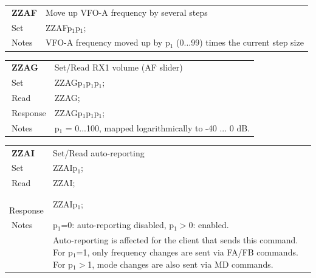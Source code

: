 \documentclass[12pt]{book}
\begin{document}
\begin{center}
\begin{tabular}{|p{2cm}|p{11cm}|}
\toprule
$\phantom{\Big|}$\textbf{\large ZZAF} & Move up VFO-A frequency by several steps \\\cline{1-2}
$\phantom{\Big|}${\large Set} & {ZZAFp$_1$p$_1$;} \\\hline
$\phantom{\Big|}${\large Notes} & \multicolumn{1}{|p{11cm}|}{VFO-A frequency moved up by p$_1$ (0...99) times the current step size} \\
\bottomrule
\end{tabular}
\end{center}

\begin{center}
\begin{tabular}{|p{2cm}|p{11cm}|}
\toprule
$\phantom{\Big|}$\textbf{\large ZZAG} & Set/Read RX1 volume (AF slider) \\\cline{1-2}
$\phantom{\Big|}${\large Set} & {ZZAGp$_1$p$_1$p$_1$;} \\\hline
$\phantom{\Big|}${\large Read} & {ZZAG;} \\\hline
$\phantom{\Big|}${\large Response} & {ZZAGp$_1$p$_1$p$_1$;} \\\hline
$\phantom{\Big|}${\large Notes} & \multicolumn{1}{|p{11cm}|}{p$_1$ = 0...100, mapped logarithmically to -40 ... 0 dB.} \\
\bottomrule
\end{tabular}
\end{center}

\begin{center}
\begin{tabular}{|p{2cm}|p{11cm}|}
\toprule
$\phantom{\Big|}$\textbf{\large ZZAI} & Set/Read auto-reporting \\\cline{1-2}
$\phantom{\Big|}${\large Set} & {ZZAIp$_1$;} \\\hline
$\phantom{\Big|}${\large Read} & {ZZAI;} \\\hline
$\phantom{\Big|}${\large Response} & {ZZAIp$_1$;} \\\hline
$\phantom{\Big|}${\large Notes} & \multicolumn{1}{|p{11cm}|}{p$_1$=0: auto-reporting disabled, p$_1$$>$0: enabled.} \\
 & \multicolumn{1}{|p{11cm}|}{Auto-reporting is affected for the client that sends this command. For p$_1$=1, only frequency changes are sent via FA/FB commands. For p$_1$$>$1, mode changes are also sent via MD commands.} \\
\bottomrule
\end{tabular}
\end{center}
\end{document}

